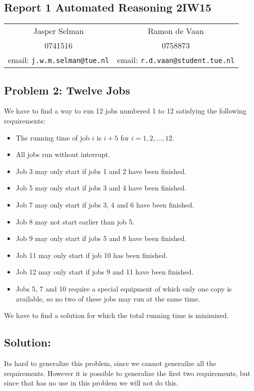 \documentclass[12pt]{article}
\begin{document}
\begin{center}
\section*{Report 1 Automated Reasoning 2IW15 }
\end{center}
\begin{center}
\begin{tabular}{c c}
Jasper Selman & Ramon de Vaan\\
0741516 & 0758873\\
email: {\tt j.w.m.selman@tue.nl} & email: {\tt r.d.vaan@student.tue.nl}
\end{tabular}
\end{center}

\vspace{8mm}

\subsection*{Problem 2: Twelve Jobs}

We have to find a way to run 12 jobs numbered 1 to 12 satisfying the following requirements:
\begin{itemize}
\item The running time of job $i$ is $i+5$ for $i = 1,2, \ldots ,12.$
\item All jobs run without interrupt.
\item Job 3 may only start if jobs 1 and 2 have been finished.
\item Job 5 may only start if jobs 3 and 4 have been finished.
\item Job 7 may only start if jobs 3, 4 and 6 have been finished.
\item Job 8 may not start earlier than job 5.
\item Job 9 may only start if jobs 5 and 8 have been finished.
\item Job 11 may only start if job 10 has been finished.
\item Job 12 may only start if jobs 9 and 11 have been finished.
\item Jobs 5, 7 and 10 require a special equipment of which only one copy is available, so no two of these jobs may run at the same time.
\end{itemize}
We have to find a solution for which the total running time is minimized. 

\vspace{8mm}

\subsection*{Solution:}
Its hard to generalize this problem, since we cannot generailze all the requirements. However it is possible to generalize the first two requirements, but since that has no use in this problem we will not do this. 
\end{document}
